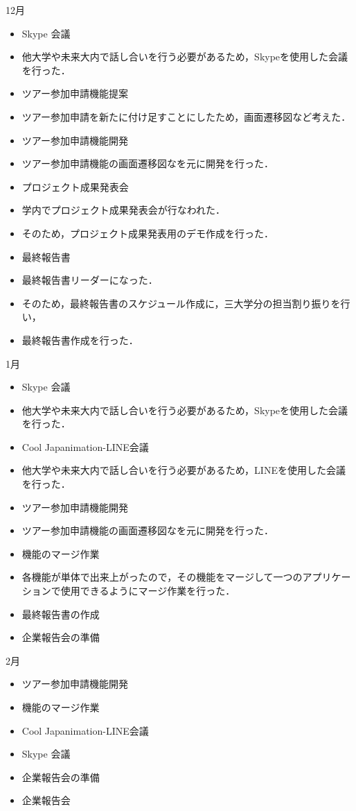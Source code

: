 12月
\begin{itemize}
\item Skype 会議
\item   他大学や未来大内で話し合いを行う必要があるため，Skypeを使用した会議を行った．
\item  ツアー参加申請機能提案
\item    ツアー参加申請を新たに付け足すことにしたため，画面遷移図など考えた．　
\item ツアー参加申請機能開発
\item    ツアー参加申請機能の画面遷移図なを元に開発を行った．
\item  プロジェクト成果発表会
\item 学内でプロジェクト成果発表会が行なわれた．
\item そのため，プロジェクト成果発表用のデモ作成を行った．
\item 最終報告書
\item   最終報告書リーダーになった．
\item   そのため，最終報告書のスケジュール作成に，三大学分の担当割り振りを行い，
\item   最終報告書作成を行った．
\end{itemize}

1月
\begin{itemize}
\item Skype 会議
\item   他大学や未来大内で話し合いを行う必要があるため，Skypeを使用した会議を行った．
\item Cool Japanimation-LINE会議
\item   他大学や未来大内で話し合いを行う必要があるため，LINEを使用した会議を行った．
\item ツアー参加申請機能開発
\item   ツアー参加申請機能の画面遷移図なを元に開発を行った．	
\item 機能のマージ作業
\item   各機能が単体で出来上がったので，その機能をマージして一つのアプリケーションで使用できるようにマージ作業を行った．
\item 最終報告書の作成
\item 企業報告会の準備
\end{itemize}

2月
\begin{itemize}
\item ツアー参加申請機能開発
\item 機能のマージ作業
\item Cool Japanimation-LINE会議
\item Skype 会議
\item 企業報告会の準備
\item 企業報告会
\end{itemize}
